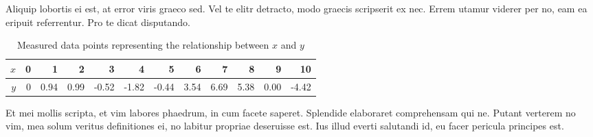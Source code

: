 Aliquip lobortis ei est, at error viris graeco sed. Vel te elitr detracto, 
modo graecis scripserit ex nec. Errem utamur viderer per no, eam ea eripuit 
referrentur. Pro te dicat disputando.

\begin{table}[hbt]
  \caption{Measured data points representing the relationship between $x$ and
    $y$}
  \begin{center}
    \begin{tabular}{r|rrrrrrrrrrr}
      \hline
      $x$ & 0 & 1 & 2 & 3 & 4 & 5 & 6 & 7 & 8 & 9 & 10\\
      \hline
      $y$ & 0 & 0.94 & 0.99 & -0.52 & -1.82 & -0.44 & 3.54 & 6.69 & 5.38 & 0.00 & -4.42\\
      \hline
    \end{tabular}
  \end{center}
  \label{CHAPTER3_TABLE01}
\end{table}

Et mei mollis scripta, et vim labores phaedrum, in cum facete saperet. 
Splendide elaboraret comprehensam qui ne. Putant verterem no vim, mea solum 
veritus definitiones ei, no labitur propriae deseruisse est. Ius illud everti 
salutandi id, eu facer pericula principes est.

